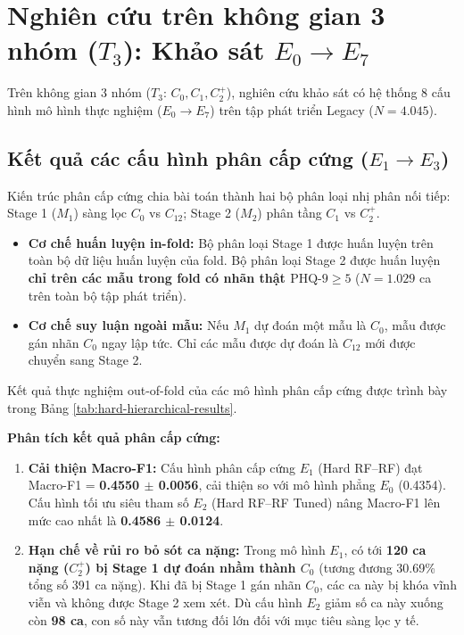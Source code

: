 \section{Nghiên cứu trên không gian 3 nhóm ($T_3$): Khảo sát $E_0 \to E_7$}
\label{sec:khao-sat-e0-e7}

Trên không gian 3 nhóm ($T_3$: $C_0, C_1, C_2^+$), nghiên cứu khảo sát có hệ thống 8 cấu hình mô hình thực nghiệm ($E_0 \to E_7$) trên tập phát triển Legacy ($N = 4.045$).

\subsection{Kết quả các cấu hình phân cấp cứng ($E_1 \to E_3$)}
Kiến trúc phân cấp cứng chia bài toán thành hai bộ phân loại nhị phân nối tiếp: Stage 1 ($M_1$) sàng lọc $C_0$ vs $C_{12}$; Stage 2 ($M_2$) phân tầng $C_1$ vs $C_2^+$.
\begin{itemize}
    \item \textbf{Cơ chế huấn luyện in-fold:} Bộ phân loại Stage 1 được huấn luyện trên toàn bộ dữ liệu huấn luyện của fold. Bộ phân loại Stage 2 được huấn luyện \textbf{chỉ trên các mẫu trong fold có nhãn thật $\text{PHQ-9} \ge 5$} ($N = 1.029$ ca trên toàn bộ tập phát triển).
    \item \textbf{Cơ chế suy luận ngoài mẫu:} Nếu $M_1$ dự đoán một mẫu là $C_0$, mẫu được gán nhãn $C_0$ ngay lập tức. Chỉ các mẫu được dự đoán là $C_{12}$ mới được chuyển sang Stage 2.
\end{itemize}

Kết quả thực nghiệm out-of-fold của các mô hình phân cấp cứng được trình bày trong Bảng \ref{tab:hard-hierarchical-results}.



\textbf{Phân tích kết quả phân cấp cứng:}
\begin{enumerate}
    \item \textbf{Cải thiện Macro-F1:} Cấu hình phân cấp cứng $E_1$ (Hard RF--RF) đạt Macro-F1 = \textbf{0.4550 $\pm$ 0.0056}, cải thiện so với mô hình phẳng $E_0$ (0.4354). Cấu hình tối ưu siêu tham số $E_2$ (Hard RF--RF Tuned) nâng Macro-F1 lên mức cao nhất là \textbf{0.4586 $\pm$ 0.0124}.
    \item \textbf{Hạn chế về rủi ro bỏ sót ca nặng:} Trong mô hình $E_1$, có tới \textbf{120 ca nặng ($C_2^+$) bị Stage 1 dự đoán nhầm thành $C_0$} (tương đương 30.69\% tổng số 391 ca nặng). Khi đã bị Stage 1 gán nhãn $C_0$, các ca này bị khóa vĩnh viễn và không được Stage 2 xem xét. Dù cấu hình $E_2$ giảm số ca này xuống còn \textbf{98 ca}, con số này vẫn tương đối lớn đối với mục tiêu sàng lọc y tế.
\end{enumerate}


